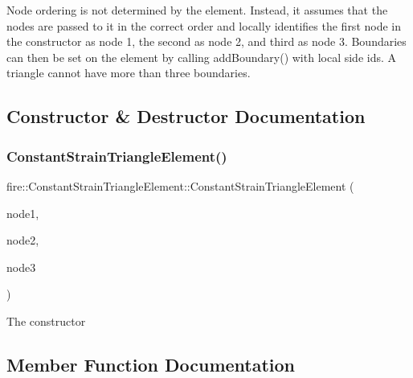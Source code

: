 Node ordering is not determined by the element. Instead, it assumes that the nodes are passed to it in the correct order and locally identifies the first node in the constructor as node 1, the second as node 2, and third as node 3. Boundaries can then be set on the element by calling add\+Boundary() with local side ids. A triangle cannot have more than three boundaries. 

\subsection{Constructor \& Destructor Documentation}
\mbox{\label{a00770_aa54c09f1dd7cacaf1f4f0b1428859c00}} 
\subsubsection{\texorpdfstring{Constant\+Strain\+Triangle\+Element()}{ConstantStrainTriangleElement()}}
{\footnotesize\ttfamily fire\+::\+Constant\+Strain\+Triangle\+Element\+::\+Constant\+Strain\+Triangle\+Element (\begin{DoxyParamCaption}\item[{const \hyperlink{a00195_a92dafcc05a788e1065a5792b67f0f70e}{Two\+D\+Node} \&}]{node1,  }\item[{const \hyperlink{a00195_a92dafcc05a788e1065a5792b67f0f70e}{Two\+D\+Node} \&}]{node2,  }\item[{const \hyperlink{a00195_a92dafcc05a788e1065a5792b67f0f70e}{Two\+D\+Node} \&}]{node3 }\end{DoxyParamCaption})}

The constructor 

\subsection{Member Function Documentation}
\mbox{\label{a00770_a7f4a8e6d0fece8943963f615caf70f09}} 
